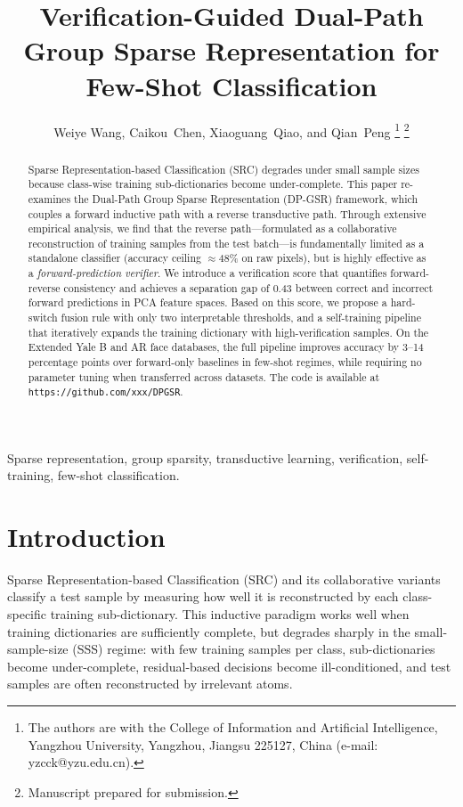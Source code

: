 \documentclass[10pt,comsoc]{IEEEtran}
\title{Verification-Guided Dual-Path Group Sparse Representation for Few-Shot Classification}
\author{Weiye Wang, Caikou~Chen, Xiaoguang~Qiao, and Qian~Peng%
\thanks{The authors are with the College of Information and Artificial Intelligence, Yangzhou University, Yangzhou, Jiangsu 225127, China (e-mail: yzcck@yzu.edu.cn).}%
\thanks{Manuscript prepared for submission.}}
\begin{document}
\maketitle

\begin{abstract}
Sparse Representation-based Classification (SRC) degrades under small sample sizes because class-wise training sub-dictionaries become under-complete. This paper re-examines the Dual-Path Group Sparse Representation (DP-GSR) framework, which couples a forward inductive path with a reverse transductive path. Through extensive empirical analysis, we find that the reverse path---formulated as a collaborative reconstruction of training samples from the test batch---is fundamentally limited as a standalone classifier (accuracy ceiling $\approx$48\% on raw pixels), but is highly effective as a \emph{forward-prediction verifier}. We introduce a verification score that quantifies forward-reverse consistency and achieves a separation gap of 0.43 between correct and incorrect forward predictions in PCA feature spaces. Based on this score, we propose a hard-switch fusion rule with only two interpretable thresholds, and a self-training pipeline that iteratively expands the training dictionary with high-verification samples. On the Extended Yale B and AR face databases, the full pipeline improves accuracy by 3--14 percentage points over forward-only baselines in few-shot regimes, while requiring no parameter tuning when transferred across datasets. The code is available at \texttt{https://github.com/xxx/DPGSR}.
\end{abstract}

\begin{IEEEkeywords}
Sparse representation, group sparsity, transductive learning, verification, self-training, few-shot classification.
\end{IEEEkeywords}

\section{Introduction}

Sparse Representation-based Classification (SRC) \cite{wright2009robust} and its collaborative variants \cite{zhang2011sparse} classify a test sample by measuring how well it is reconstructed by each class-specific training sub-dictionary. This inductive paradigm works well when training dictionaries are sufficiently complete, but degrades sharply in the small-sample-size (SSS) regime: with few training samples per class, sub-dictionaries become under-complete, residual-based decisions become ill-conditioned, and test samples are often reconstructed by irrelevant atoms.
\end{document}
